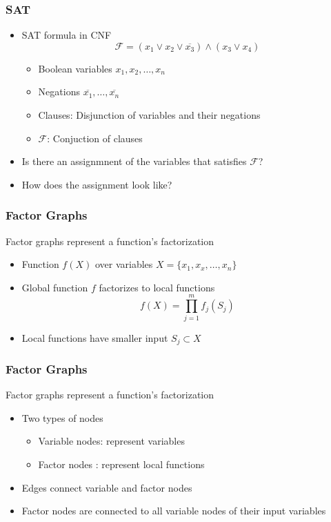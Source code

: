 \begin{frame}
	\frametitle{SAT}
\vspace{-0.5cm}
  \begin{itemize}
    \item SAT formula in CNF
    $$\mathcal{F} = (x_1 \lor x_2 \lor \overline{x_3}) \land (x_3 \lor x_4)$$
    \vspace{-0.5cm}
    	\begin{itemize}
    		\item Boolean variables $x_1, x_2, \ldots, x_n$
    		\item Negations $\overline{x_1}, \ldots, \overline{x_n}$
    		\item Clauses: Disjunction of variables and their negations
    		\item $\mathcal{F}$: Conjuction of clauses
    	\end{itemize}
    \item Is there an assignmnent of the variables that satisfies $\mathcal{F}$?
    \item How does the assignment look like?
  \end{itemize}
\end{frame}

\begin{frame}
	\frametitle{Factor Graphs}
	\vspace{-0.5cm}
		Factor graphs represent a function's factorization
		
		\begin{itemize}
			\item Function $f(X)$ over variables $X = \{x_1, x_x, \ldots, x_n\}$
			\item Global function $f$ factorizes to local functions
			$$ f(X) = \prod_{j=1}^m f_j(S_j)$$
			\item Local functions have smaller input $S_j \subset X$
		\end{itemize}
\end{frame}

\begin{frame}
	\frametitle{Factor Graphs}
		Factor graphs represent a function's factorization
		
		\begin{itemize}
			\item Two types of nodes
				\begin{itemize}
					\item Variable nodes: represent variables
					\item Factor nodes  : represent local functions
				\end{itemize}
			\item Edges connect variable and factor nodes
			\item Factor nodes are connected to all variable nodes of their input variables
		\end{itemize}
\end{frame}



